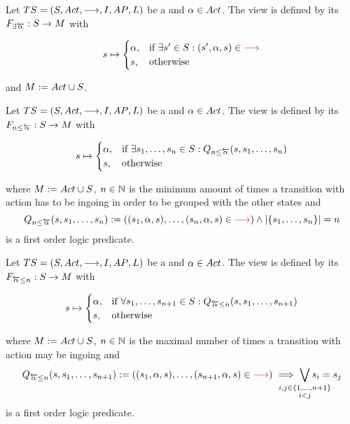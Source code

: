 \documentclass[preview]{standalone}
\begin{document}
\begin{definition}
	Let ${TS} = {({S}, {Act}, {\longrightarrow}, {I}, {AP}, {L})}$ be a \chosengraphtypeN and ${\alpha} \in {Act}$. The view \viewhasinaction is defined by its \grpfctN ${{{{F}}_{\exists{\overleftarrow{\ensuremath{{\alpha}}}}}}} : {S} \to {\ensuremath{{M}}}$ with 
	
	\[
	{s} \mapsto
	\begin{cases}
		{\alpha},				& \text{if } \exists {s}' \in {S}: ({s}', {\alpha}, {s}) \in {\color{red}\ensuremath{{\longrightarrow}}} \\
		{s},          	& \text{otherwise}
	\end{cases}
	\]
	
	and ${{M}} := {Act} \cup {S}$.	
	\label{def:mininaction}
\end{definition}	


\begin{definition}
	Let ${TS} = {({S}, {Act}, {\longrightarrow}, {I}, {AP}, {L})}$ be a \chosengraphtypeN and ${\alpha} \in {Act}$. The view \viewmininaction is defined by its \grpfctN ${{{{F}}_{{n}\leq{\overleftarrow{\ensuremath{{\alpha}}}}}}} : {S} \to {M}$ with
	
	\[
	{s} \mapsto
	\begin{cases}
		{\alpha},				& \text{if } \exists {s}_1, \dots, {s}_{n} \in {S}:  {Q_{{n}\leq{\overleftarrow{\ensuremath{{\alpha}}}}}({s},{s}_1, \dots, {s}_{{n}})}\\
		{s},          	& \text{otherwise}
	\end{cases}
	\]
	
	where ${{M}} := {Act} \cup {S}$, ${n} \in {\mathbb{N}}$ is the minimum amount of times a transition with action \action has to be ingoing in order to be grouped with the other states and
	\[
	{Q_{{n}\leq{\overleftarrow{\ensuremath{{\alpha}}}}}({s},{s}_1, \dots, {s}_{{n}})} := (({s}_1, {\alpha}, {s}), \dots, ({s}_{n}, {\alpha}, {s}) \in {\color{red}\ensuremath{{\longrightarrow}}}) \land |\{{s}_1, \dots, {s}_{n}\}| = {n}
	\]
	is a first order logic predicate.
	\label{def:viewmaxinaction}
\end{definition}

\begin{definition}
	Let ${TS} = {({S}, {Act}, {\longrightarrow}, {I}, {AP}, {L})}$ be a \chosengraphtypeN and ${\alpha} \in {Act}$. The view \viewmaxinaction is defined by its \grpfctN ${{{{F}}_{{\overleftarrow{{\alpha}}}\leq{n}}}} : {S} \to {M}$ with
	
	\[
	{s} \mapsto
	\begin{cases}
		{\alpha},				& \text{if } \forall {s}_1, \dots, {s}_{{n}+1} \in {S}: {Q_{{\overleftarrow{{\alpha}}}\leq{n}}({s},{s}_1, \dots, {s}_{{n}+1})} \\
		{s},          	& \text{otherwise}
	\end{cases}
	\]
	
	where ${{M}} := {Act} \cup {S}$, ${n} \in {\mathbb{N}}$ is the maximal number of times a transition with action \action may be ingoing and 
	\[
	\predmaxinact := ((\state_1, \action, \state), \dots, (\state_{\numinact+1}, \action, \state) \in \redcomment{\transitionrel}) \implies \bigvee_{\mathclap{\substack{i,j \in \{1,\dots, \numinact+1\} \\ i < j}}} \state_i = \state_j
	\]
	is a first order logic predicate.
\end{definition}
\end{document}
